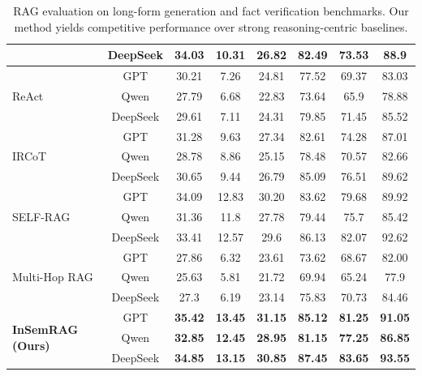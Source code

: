 \begin{table}[!htb]
\begin{threeparttable}
\begin{tabular}{|p{50pt}|c|c|c|c|c|c|c|}
        & DeepSeek & 34.03 & 10.31 & 26.82 & 82.49 & 73.53 & 88.9\\
        \hline
        \multirow{3}{40pt}{ReAct} & GPT & 30.21 & 7.26 & 24.81 & 77.52 & 69.37 & 83.03\\
        & Qwen & 27.79 & 6.68 & 22.83 & 73.64 & 65.9 & 78.88\\
        & DeepSeek & 29.61 & 7.11 & 24.31 & 79.85 & 71.45 & 85.52\\
        \hline
        \multirow{3}{40pt}{IRCoT} & GPT & 31.28 & 9.63 & 27.34 & 82.61 & 74.28 & 87.01\\
        & Qwen & 28.78 & 8.86 & 25.15 & 78.48 & 70.57 & 82.66\\
        & DeepSeek & 30.65 & 9.44 & 26.79 & 85.09 & 76.51 & 89.62\\
        \hline
        \multirow{3}{40pt}{SELF-RAG} & GPT & 34.09 & 12.83 & 30.20 & 83.62 & 79.68 & 89.92\\
        & Qwen & 31.36 & 11.8 & 27.78 & 79.44 & 75.7 & 85.42\\
        & DeepSeek & 33.41 & 12.57 & 29.6 & 86.13 & 82.07 & 92.62\\
        \hline
        \multirow{3}{40pt}{Multi-Hop RAG} & GPT & 27.86 & 6.32 & 23.61 & 73.62 & 68.67 & 82.00\\
        & Qwen & 25.63 & 5.81 & 21.72 & 69.94 & 65.24 & 77.9\\
        & DeepSeek & 27.3 & 6.19 & 23.14 & 75.83 & 70.73 & 84.46\\
        \hline
        \multirow{3}{40pt}{\textbf{InSemRAG (Ours)}} & GPT & \textbf{35.42} & \textbf{13.45} & \textbf{31.15} & \textbf{85.12} & \textbf{81.25} & \textbf{91.05}\\
        & Qwen & \textbf{32.85} & \textbf{12.45} & \textbf{28.95} & \textbf{81.15} & \textbf{77.25} & \textbf{86.85}\\
        & DeepSeek & \textbf{34.85} & \textbf{13.15} & \textbf{30.85} & \textbf{87.45} & \textbf{83.65} & \textbf{93.55}\\
        \hline
    \end{tabular}
    \caption{RAG evaluation on long-form generation and fact verification benchmarks. Our method yields competitive performance over strong reasoning-centric baselines.}
    \label{tab:main2}
    \end{threeparttable}
\end{table}



